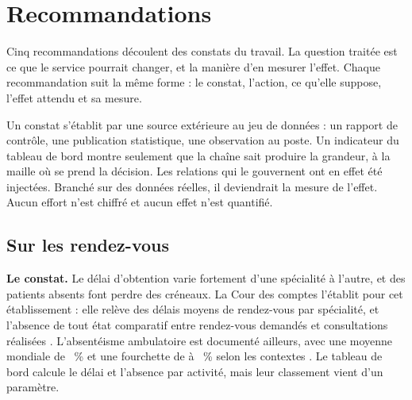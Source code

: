 
\chapter{Recommandations}\label{chap:recommandations}

Cinq recommandations découlent des constats du travail. La question traitée est ce que le service
pourrait changer, et la manière d'en mesurer l'effet. Chaque recommandation suit la même forme : le
constat, l'action, ce qu'elle suppose, l'effet attendu et sa mesure.

Un constat s'établit par une source extérieure au jeu de données : un rapport de contrôle, une
publication statistique, une observation au poste. Un indicateur du tableau de bord montre seulement
que la chaîne sait produire la grandeur, à la maille où se prend la décision. Les relations qui le
gouvernent ont en effet été injectées. Branché sur des données réelles, il deviendrait la mesure de l'effet.
Aucun effort n'est chiffré et aucun effet n'est quantifié.

\section{Sur les rendez-vous}

\textbf{Le constat.} Le délai d'obtention varie fortement d'une spécialité à l'autre, et des patients
absents font perdre des créneaux. La Cour des comptes l'établit pour cet établissement : elle relève
des délais moyens de rendez-vous par spécialité, et l'absence de tout état comparatif entre
rendez-vous demandés et consultations réalisées \cite{s20}. L'absentéisme ambulatoire est documenté
ailleurs, avec une moyenne mondiale de ~\% et une
fourchette de  à
~\% selon les contextes \cite{s24}. Le tableau de bord
calcule le délai et l'absence par activité, mais leur classement vient d'un
paramètre.

